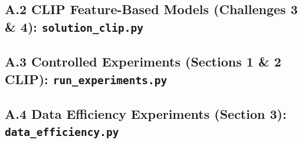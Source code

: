 \documentclass[11pt]{article}
\begin{document}


\subsection*{A.2 CLIP Feature-Based Models (Challenges 3 \& 4): \texttt{solution\_clip.py}}



\subsection*{A.3 Controlled Experiments (Sections 1 \& 2 CLIP): \texttt{run\_experiments.py}}



\subsection*{A.4 Data Efficiency Experiments (Section 3): \texttt{data\_efficiency.py}}


\end{document}
